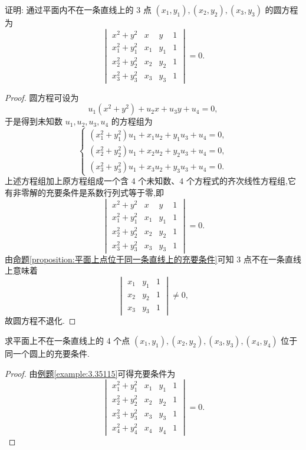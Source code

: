 \documentclass[lang=cn,newtx,10pt,scheme=chinese]{elegantbook}
\begin{document}
\begin{example}\label{example:3.35115}
证明: 通过平面内不在一条直线上的 3 点 \((x_1,y_1),(x_2,y_2),(x_3,y_3)\) 的圆方程为
\[
\begin{vmatrix}
x^2 + y^2&x&y&1\\
x_1^2 + y_1^2&x_1&y_1&1\\
x_2^2 + y_2^2&x_2&y_2&1\\
x_3^2 + y_3^2&x_3&y_3&1
\end{vmatrix}=0.
\]
\end{example}
\begin{proof}
    圆方程可设为
    \[
    u_1(x^2 + y^2)+u_2x + u_3y + u_4 = 0,
    \]
    于是得到未知数 \(u_1,u_2,u_3,u_4\) 的方程组为
    \[
    \begin{cases}
    (x_1^2 + y_1^2)u_1 + x_1u_2 + y_1u_3 + u_4 = 0,\\
    (x_2^2 + y_2^2)u_1 + x_2u_2 + y_2u_3 + u_4 = 0,\\
    (x_3^2 + y_3^2)u_1 + x_3u_2 + y_3u_3 + u_4 = 0.
    \end{cases}
    \]
    上述方程组加上原方程组成一个含 4 个未知数、4 个方程式的齐次线性方程组,它有非零解的充要条件是系数行列式等于零,即
    \[
    \begin{vmatrix}
    x^2 + y^2&x&y&1\\
    x_1^2 + y_1^2&x_1&y_1&1\\
    x_2^2 + y_2^2&x_2&y_2&1\\
    x_3^2 + y_3^2&x_3&y_3&1
    \end{vmatrix}=0.
    \]
    由\hyperref[proposition:平面上点位于同一条直线上的充要条件]{命题\ref{proposition:平面上点位于同一条直线上的充要条件}}可知 3 点不在一条直线上意味着
    \[
    \begin{vmatrix}
    x_1&y_1&1\\
    x_2&y_2&1\\
    x_3&y_3&1
    \end{vmatrix}\neq0,
    \]
    故圆方程不退化.  
\end{proof}

\begin{proposition}\label{proposition:平面上4点共圆的充要条件}
求平面上不在一条直线上的 4 个点 \((x_1,y_1),(x_2,y_2),(x_3,y_3),(x_4,y_4)\) 位于同一个圆上的充要条件.
\end{proposition}
\begin{proof}
由\hyperref[example:3.35115]{例题\ref{example:3.35115}}可得充要条件为
\[
\begin{vmatrix}
x_1^2 + y_1^2&x_1&y_1&1\\
x_2^2 + y_2^2&x_2&y_2&1\\
x_3^2 + y_3^2&x_3&y_3&1\\
x_4^2 + y_4^2&x_4&y_4&1
\end{vmatrix}=0.
\]
\end{proof}
\end{document}
